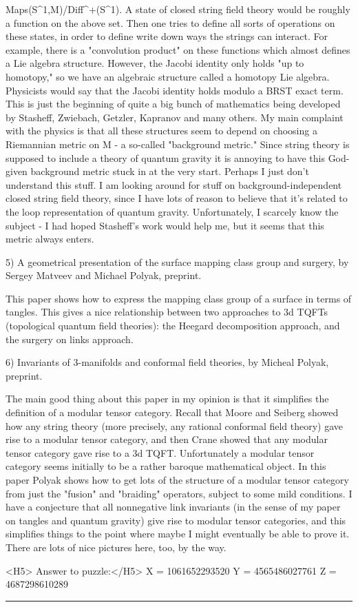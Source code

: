                        Maps(S^{1},M)/Diff^{+}(S^{1}).
A state of closed string field theory would be roughly a function on the
above set.  Then one tries to define all sorts of operations on these
states, in order to define write down ways the strings can interact.
For example, there is a "convolution product" on these functions which
almost defines a Lie algebra structure.  However, the Jacobi identity
only holds "up to homotopy," so we have an algebraic structure called a
homotopy Lie algebra.  Physicists would say that the Jacobi identity
holds modulo a BRST exact term.  This is just the beginning of quite a
big bunch of mathematics being developed by Stasheff, Zwiebach, Getzler,
Kapranov and many others.  My main complaint with the physics is that
all these structures seem to depend on choosing a Riemannian metric on
M - a so-called "background metric."  Since string theory is supposed to
include a theory of quantum gravity it is annoying to have this
God-given background metric stuck in at the very start.  Perhaps I just
don't understand this stuff.  I am looking around for stuff on
background-independent closed string field theory, since I have lots of
reason to believe that it's related to the loop representation of
quantum gravity.  Unfortunately, I scarcely know the subject - I had
hoped Stasheff's work would help me, but it seems that this metric
always enters.

5)  A geometrical presentation of the surface mapping class group and
surgery, by Sergey Matveev and Michael Polyak, preprint.  

This paper shows how to express the mapping class group of a surface in
terms of tangles.  This gives a nice relationship between two approaches
to 3d TQFTs (topological quantum field theories): the Heegard
decomposition approach, and the surgery on links approach.  

6)  Invariants of 3-manifolds and conformal field theories, by Micheal
Polyak, preprint.

The main good thing about this paper in my opinion is that it
simplifies the definition of a modular tensor category.  Recall that
Moore and Seiberg showed how any string theory (more precisely, any
rational conformal field theory) gave rise to a modular tensor category,
and then Crane showed that any modular tensor category gave rise to a 3d
TQFT.  Unfortunately a modular tensor category seems initially to be a
rather baroque mathematical object.  In this paper Polyak shows how to
get lots of the structure of a modular tensor category from just the
"fusion" and "braiding" operators, subject to some mild conditions.  I
have a conjecture that all nonnegative link invariants (in the sense
of my paper on tangles and quantum gravity) give rise to modular tensor
categories, and this simplifies things to the point where maybe I might
eventually be able to prove it.  There are lots of nice pictures here,
too, by the way.


<H5> Answer to puzzle:</H5>
X = 1061652293520
Y = 4565486027761
Z = 4687298610289


\par\noindent\rule{\textwidth}{0.4pt}


